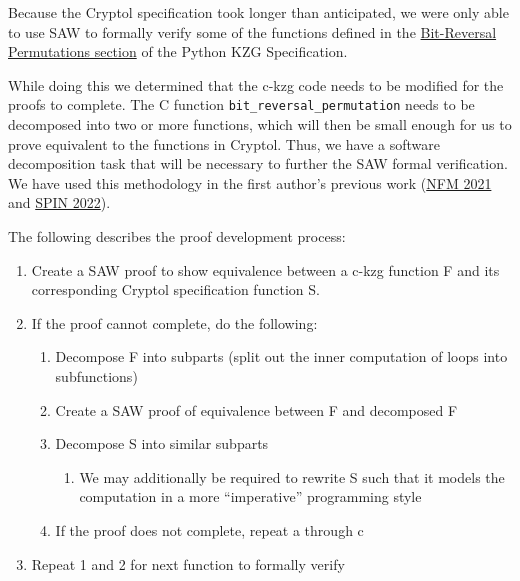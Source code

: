 \documentclass[12pt]{galois-whitepaper}
\begin{document}
Because the Cryptol specification took longer than anticipated, we were only able to use SAW to formally verify
some of the functions defined in the \href{https://github.com/ethereum/consensus-specs/blob/68d32accf945a84f69d4c779cb6c71223a311eac/specs/deneb/polynomial-commitments.md\#bit-reversal-permutation}{Bit-Reversal Permutations section}
of the Python KZG Specification.

While doing this we determined that the c-kzg code needs to be modified for the proofs to complete.
The C function \texttt{bit\_reversal\_permutation} needs to be decomposed into two or more functions,
which will then be small enough for us to prove equivalent to the functions in Cryptol. Thus, we have
a software decomposition task that will be necessary to further the SAW formal verification. We have used this
methodology in the first author's previous work (\href{https://link.springer.com/chapter/10.1007/978-3-030-76384-8_5}{NFM 2021} and
\href{https://link.springer.com/chapter/10.1007/978-3-031-15077-7_6}{SPIN 2022}).

The following describes the proof development process:
\begin{enumerate}
    \item Create a SAW proof to show equivalence between a c-kzg function F and its corresponding Cryptol specification function S.
    \item If the proof cannot complete, do the following:
          \begin{enumerate}
                \item Decompose F into subparts (split out the inner computation of loops into subfunctions)
                \item Create a SAW proof of equivalence between F and decomposed F
                \item Decompose S into similar subparts
                      \begin{enumerate}
                        \item We may additionally be required to rewrite S such that it models the computation in a more “imperative” programming style
                      \end{enumerate}
                \item If the proof does not complete, repeat a through c
          \end{enumerate}
    \item Repeat 1 and 2 for next function to formally verify
\end{enumerate}
\end{document}
